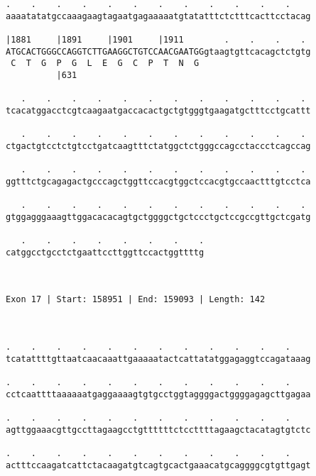 \documentclass{article}
\begin{document}
\begin{Verbatim}
.    .    .    .    .    .    .    .    .    .    .    .    
aaaatatatgccaaagaagtagaatgagaaaaatgtatatttctctttcacttcctacag
                                                            
|1881     |1891     |1901     |1911        .    .    .    . 
ATGCACTGGGCCAGGTCTTGAAGGCTGTCCAACGAATGGgtaagtgttcacagctctgtg
 C  T  G  P  G  L  E  G  C  P  T  N  G                      
          |631                                              
  
   .    .    .    .    .    .    .    .    .    .    .    . 
tcacatggacctcgtcaagaatgaccacactgctgtgggtgaagatgctttcctgcattt
                                                            
   .    .    .    .    .    .    .    .    .    .    .    . 
ctgactgtcctctgtcctgatcaagtttctatggctctgggccagcctaccctcagccag
                                                            
   .    .    .    .    .    .    .    .    .    .    .    . 
ggtttctgcagagactgcccagctggttccacgtggctccacgtgccaactttgtcctca
                                                            
   .    .    .    .    .    .    .    .    .    .    .    . 
gtggagggaaagttggacacacagtgctggggctgctccctgctccgccgttgctcgatg
                                                            
   .    .    .    .    .    .    .    .
catggcctgcctctgaattccttggttccactggttttg
                                       
                                       
 
Exon 17 | Start: 158951 | End: 159093 | Length: 142



.    .    .    .    .    .    .    .    .    .    .    .    
tcatattttgttaatcaacaaattgaaaaatactcattatatggagaggtccagataaag
                                                            
.    .    .    .    .    .    .    .    .    .    .    .    
cctcaattttaaaaaatgaggaaaagtgtgcctggtaggggactggggagagcttgagaa
                                                            
.    .    .    .    .    .    .    .    .    .    .    .    
agttggaaacgttgccttagaagcctgttttttctccttttagaagctacatagtgtctc
                                                            
.    .    .    .    .    .    .    .    .    .    .    .    
actttccaagatcattctacaagatgtcagtgcactgaaacatgcaggggcgtgttgagt
                                                            

\end{Verbatim}
\end{document}
